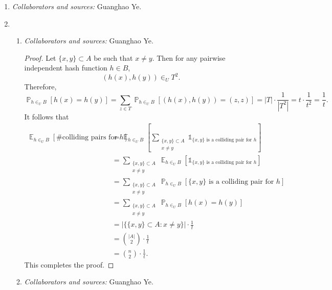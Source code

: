 \documentclass[letterpaper, reqno,11pt]{article}
\newcommand{\PP}{\mathop{{}\mathbb{P}}}
\newcommand{\EE}{\mathop{{}\mathbb{E}}}
\begin{document}
\begin{enumerate}
  \item \noindent\emph{Collaborators and sources:} Guanghao Ye.
  
  \clearpage

  \item \begin{enumerate}
    \item \noindent\emph{Collaborators and sources:} Guanghao Ye.
    
    \begin{proof}
      Let $\{ x, y \} \subset A$ be such that $x \neq y$. Then for any pairwise independent hash function $h \in B$,
      $$ (h(x), h(y)) \in_U T^2. $$
      Therefore,
      \begin{equation} \label{eq:2a-prob}
        \PP_{h \in_U B}[h(x) = h(y)] = \sum_{z \in T} \PP_{h \in_U B}[(h(x), h(y)) = (z, z)] = |T| \cdot \frac{1}{\left|T^2\right|} = t \cdot \frac{1}{t^2} = \frac{1}{t}.
      \end{equation}
      It follows that
      \begin{align*}
        \EE_{h \in_U B}[\text{\# colliding pairs for $h$}] &= \EE_{h \in_U B}\left[\sum_{\substack{\{ x, y \} \subset A \\ x \neq y}} \mathds 1_{\text{$\{ x, y \}$ is a colliding pair for $h$}}\right] \\
        &= \sum_{\substack{\{ x, y \} \subset A \\ x \neq y}} \EE_{h \in_U B}\left[\mathds 1_{\text{$\{ x, y \}$ is a colliding pair for $h$}}\right] \\
        &= \sum_{\substack{\{ x, y \} \subset A \\ x \neq y}} \PP_{h \in_U B}\left[\text{$\{ x, y \}$ is a colliding pair for $h$}\right] \\
        &= \sum_{\substack{\{ x, y \} \subset A \\ x \neq y}} \PP_{h \in_U B}[h(x) = h(y)] \\
        &= |\{ \{ x, y \} \subset A : x \neq y \}| \cdot \frac{1}{t} \\
        &= \binom{|A|}{2} \cdot \frac{1}{t} \\
        &= \binom{n}{2} \cdot \frac{1}{t}.
      \end{align*}
      This completes the proof.
    \end{proof}
    
    \clearpage

    \item \noindent\emph{Collaborators and sources:} Guanghao Ye.
    

\end{enumerate}
\end{enumerate}
\end{document}
